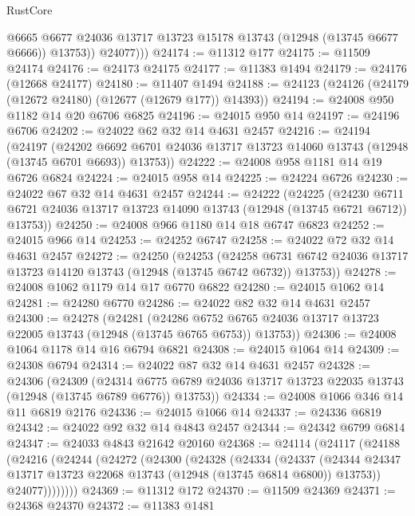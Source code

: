 \begin{lexlean}{RustCore}
\begin{coremodule}
              @6665
              @6677
              @24036
              @13717
              @13723
              @15178
              @13743
              (@12948 (@13745 @6677 @6666))
              @13753))
          @24077)))
@24174 := @11312 @177
@24175 := @11509 @24174
@24176 := @24173 @24175
@24177 := @11383 @1494
@24179 := @24176 (@12668 @24177)
@24180 := @11407 @1494
@24188 := @24123 (@24126 (@24179 (@12672 @24180) (@12677 (@12679 @177)) @14393))
@24194 := @24008 @950 @1182 @14 @20 @6706 @6825
@24196 := @24015 @950 @14
@24197 := @24196 @6706
@24202 := @24022 @62 @32 @14 @4631 @2457
@24216 := @24194
    (@24197
      (@24202 @6692 @6701 @24036 @13717 @13723 @14060 @13743 (@12948 (@13745 @6701 @6693)) @13753))
@24222 := @24008 @958 @1181 @14 @19 @6726 @6824
@24224 := @24015 @958 @14
@24225 := @24224 @6726
@24230 := @24022 @67 @32 @14 @4631 @2457
@24244 := @24222
    (@24225
      (@24230 @6711 @6721 @24036 @13717 @13723 @14090 @13743 (@12948 (@13745 @6721 @6712)) @13753))
@24250 := @24008 @966 @1180 @14 @18 @6747 @6823
@24252 := @24015 @966 @14
@24253 := @24252 @6747
@24258 := @24022 @72 @32 @14 @4631 @2457
@24272 := @24250
    (@24253
      (@24258 @6731 @6742 @24036 @13717 @13723 @14120 @13743 (@12948 (@13745 @6742 @6732)) @13753))
@24278 := @24008 @1062 @1179 @14 @17 @6770 @6822
@24280 := @24015 @1062 @14
@24281 := @24280 @6770
@24286 := @24022 @82 @32 @14 @4631 @2457
@24300 := @24278
    (@24281
      (@24286 @6752 @6765 @24036 @13717 @13723 @22005 @13743 (@12948 (@13745 @6765 @6753)) @13753))
@24306 := @24008 @1064 @1178 @14 @16 @6794 @6821
@24308 := @24015 @1064 @14
@24309 := @24308 @6794
@24314 := @24022 @87 @32 @14 @4631 @2457
@24328 := @24306
    (@24309
      (@24314 @6775 @6789 @24036 @13717 @13723 @22035 @13743 (@12948 (@13745 @6789 @6776)) @13753))
@24334 := @24008 @1066 @346 @14 @11 @6819 @2176
@24336 := @24015 @1066 @14
@24337 := @24336 @6819
@24342 := @24022 @92 @32 @14 @4843 @2457
@24344 := @24342 @6799 @6814
@24347 := @24033 @4843 @21642 @20160
@24368 := @24114
    (@24117
      (@24188
        (@24216
          (@24244
            (@24272
              (@24300
                (@24328
                  (@24334
                    (@24337
                      (@24344
                        @24347
                        @13717
                        @13723
                        @22068
                        @13743
                        (@12948 (@13745 @6814 @6800))
                        @13753))
                    @24077))))))))
@24369 := @11312 @172
@24370 := @11509 @24369
@24371 := @24368 @24370
@24372 := @11383 @1481

\end{coremodule}
\end{lexlean}
